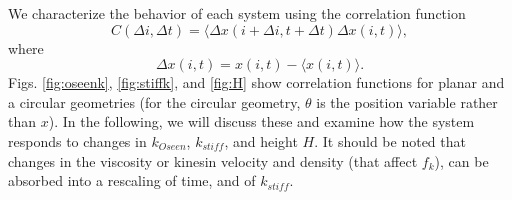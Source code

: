 \documentclass[11pt]{ucthesis}
\begin{document}
We characterize the behavior of each system using the correlation function 
\begin{equation}
C(\Delta i, \Delta t) = \langle \Delta x(i + \Delta i, t+\Delta t)\Delta x(i,t)\rangle,
\end{equation}
where
\[
\Delta x(i,t) = x(i,t) - \langle x(i,t)\rangle.
\]
Figs.  \ref{fig:oseenk}, \ref{fig:stiffk}, and \ref{fig:H} 
show correlation functions for planar
and a circular geometries (for the circular geometry, $\theta$ is
the position variable rather than $x$). 
In the following, we will discuss these and examine how the system responds to changes in $k_{Oseen}$,
$k_{stiff}$, and height $H$. It should be noted that changes in the viscosity or kinesin velocity and density 
(that affect $f_k$), can be absorbed into a rescaling of time, and of $k_{stiff}$.
\end{document}
